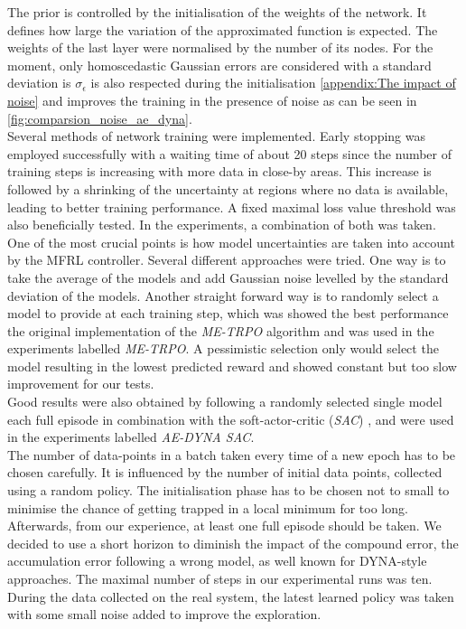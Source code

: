 \documentclass[
reprint,
amsmath,amssymb,amsfonts,clevref,
aps,
prstab,
]{revtex4-2}
\begin{document}
The prior is controlled by the initialisation of the weights of the network. It defines how large the variation of the approximated function is expected. The weights of the last layer were normalised by the number of its nodes. For the moment, only homoscedastic Gaussian errors are considered with a standard deviation is $\sigma_\epsilon$ is also respected during the initialisation \cref{appendix:The impact of noise} and improves the training in the presence of noise as can be seen in \cref{fig:comparsion_noise_ae_dyna}. \\
Several methods of network training were implemented. Early stopping was employed successfully with a waiting time of about 20 steps since the number of training steps is increasing with more data in close-by areas. This increase is followed by a shrinking of the uncertainty at regions where no data is available, leading to better training performance. A fixed maximal loss value threshold was also beneficially tested. In the experiments, a combination of both was taken.\\
One of the most crucial points is how model uncertainties are taken into account by the MFRL controller. Several different approaches were tried. One way is to take the average of the models and add Gaussian noise levelled by the standard deviation of the models. Another straight forward way is to randomly select a model to provide at each training step, which was showed the best performance the original implementation of the \emph{ME-TRPO} algorithm and was used in the experiments labelled \emph{ME-TRPO}. A pessimistic selection only would select the model resulting in the lowest predicted reward and showed constant but too slow improvement for our tests.
\\ Good results were also obtained by following a randomly selected single model each full episode in combination with the soft-actor-critic (\emph{SAC}) \cite{fujimoto2018addressing,Hill2018}, and were used in the experiments labelled \emph{AE-DYNA SAC}. \\
The number of data-points in a batch taken every time of a new epoch has to be chosen carefully. It is influenced by the number of initial data points, collected using a random policy. The initialisation phase has to be chosen not to small to minimise the chance of getting trapped in a local minimum for too long. Afterwards, from our experience, at least one full episode should be taken. We decided to use a short horizon to diminish the impact of the compound error, the accumulation error following a wrong model, as well known for DYNA-style approaches. The maximal number of steps in our experimental runs was ten. During the data collected on the real system, the latest learned policy was taken with some small noise added to improve the exploration.\\
\end{document}
